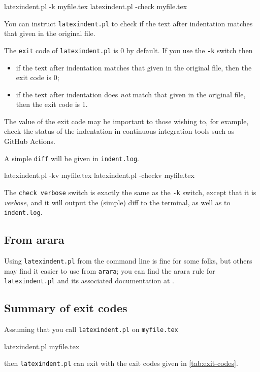 	\begin{commandshell}
latexindent.pl -k myfile.tex
latexindent.pl -check myfile.tex
\end{commandshell}
	You can%
	 instruct
	\texttt{latexindent.pl} to check if the text after indentation matches that given in the
	original file.

	The \texttt{exit} code
	 of \texttt{latexindent.pl} is 0 by default. If
	you use the \texttt{-k} switch then
	\begin{itemize}
		\item if the text after indentation matches that given in the original file, then the exit code
		      is 0;
		\item if the text after indentation does \emph{not} match that given in the original file, then
		      the exit code is 1.
	\end{itemize}

	The value of the exit code may be important to those wishing to, for example, check the
	status of the indentation in continuous integration tools such as GitHub Actions.

	A simple \texttt{diff} will be given in \texttt{indent.log}.

	\begin{commandshell}
latexindent.pl -kv myfile.tex
latexindent.pl -checkv myfile.tex
\end{commandshell}
	 The \texttt{check verbose} switch is
	exactly the same as the \texttt{-k} switch, except that it is \emph{verbose}, and it will
	output the (simple) diff to the terminal, as well as to \texttt{indent.log}.

\subsection{From arara}\label{sec:arara}
	Using \texttt{latexindent.pl} from the command line is fine for some folks, but others
	may find it easier to use from \texttt{arara}; you can find the arara rule for
	\texttt{latexindent.pl} and its associated documentation at \cite{paulo}.

\subsection{Summary of exit codes}
	Assuming that you call \texttt{latexindent.pl} on \texttt{myfile.tex}
	\begin{commandshell}
latexindent.pl myfile.tex
\end{commandshell}
	then \texttt{latexindent.pl} can exit with the exit codes given in \cref{tab:exit-codes}.

